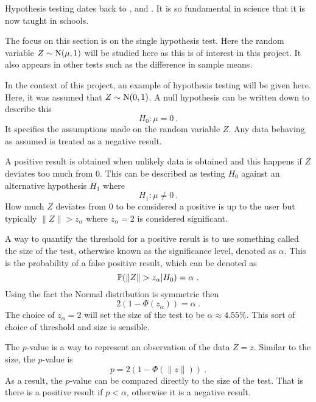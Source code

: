 Hypothesis testing dates back to \cite{pearson1900on}, \cite{neyman1933on} and \cite{fisher1970statistical}. It is so fundamental in science that it is now taught in schools.

The focus on this section is on the single hypothesis test. Here the random variable $Z\sim\operatorname{N}(\mu,1)$ will be studied here as this is of interest in this project. It also appears in other tests such as the difference in sample means.

In the context of this project, an example of hypothesis testing will be given here. Here, it was assumed that $Z\sim\operatorname{N}(0,1)$. A null hypothesis can be written down to describe this
\begin{equation}
    H_0:\mu=0 \ .
\end{equation}
It specifies the assumptions made on the random variable $Z$. Any data behaving as assumed is treated as a negative result.

A positive result is obtained when unlikely data is obtained and this happens if $Z$ deviates too much from 0. This can be described as testing $H_0$ against an alternative hypothesis $H_1$ where
\begin{equation}
    H_1:\mu\neq0 \ .
\end{equation}
How much $Z$ deviates from 0 to be considered a positive is up to the user but typically $\|Z\|>z_\alpha$ where $z_\alpha =2$ is considered significant.

A way to quantify the threshold for a positive result is to use something called the size of the test, otherwise known as the significance level, denoted as $\alpha$. This is the probability of a false positive result, which can be denoted as
\begin{equation}
    \prob(\|Z\|>z_\alpha|H_0) = \alpha \ .
\end{equation}
Using the fact the Normal distribution is symmetric then
\begin{equation}
    2(1 - \Phi(z_\alpha)) = \alpha \ .
    \label{eq:inference_single_alpha}
\end{equation}
The choice of $z_\alpha=2$ will set the size of the test to be $\alpha\approx 4.55\%$. This sort of choice of threshold and size is sensible.

The $p$-value is a way to represent an observation of the data $Z=z$. Similar to the size, the $p$-value is
\begin{equation}
    p=2(1-\Phi(\|z\|)) \ .
\end{equation}
As a result, the $p$-value can be compared directly to the size of the test. That is there is a positive result if $p<\alpha$, otherwise it is a negative result.

